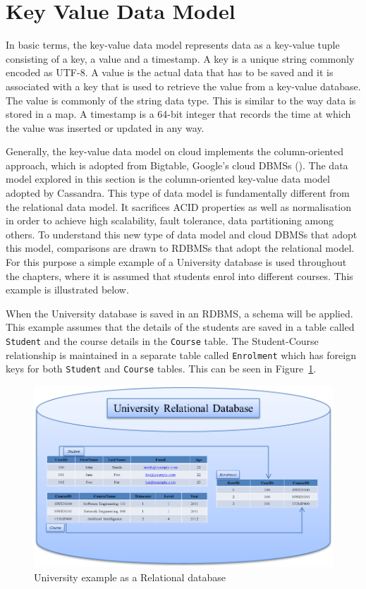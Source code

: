 \section{Key Value Data Model}\label{s:key-value-data-model}
In basic terms,   the key-value data model represents data as a key-value tuple
consisting of a key,   a value and a timestamp.  A key is a unique string
commonly encoded as UTF-8.  A value is the actual data that has to be saved and
it is associated with a key that is used to retrieve the value from a key-value
database.  The value is commonly of the string data type.
This is similar to the way data is stored in a map.  A timestamp is a 64-bit
integer that records the time at which the value was inserted or updated in any
way.

Generally,   the key-value data model on cloud implements the column-oriented
approach,   which is adopted from Bigtable,   Google's cloud \acp{DBMS}
().  The data model explored in this section is the column-oriented
key-value data model adopted by Cassandra.  This type of data model is
fundamentally different from the relational data model.  It sacrifices ACID
properties as well as normalisation in order to achieve high scalability,  
fault tolerance,   data partitioning among others.  To understand this new type
of data model and cloud \acp{DBMS} that adopt this model,   comparisons are
drawn to \acp{RDBMS} that adopt the relational model.  For this purpose a simple
example of a University database is used throughout the chapters,   where it is
assumed that students enrol into different courses.  This example is illustrated
below.

When the University database is saved in an \ac{RDBMS},   a schema will be
applied. This example assumes that the details of the students are saved in a
table called \texttt{Student} and the course details in the \texttt{Course}
table. The Student-Course relationship is maintained in a separate table called
\texttt{Enrolment} which has foreign keys for both \texttt{Student} and
\texttt{Course} tables.  This can be seen in Figure~\ref{f:RDB}. 


\begin{figure}[h]
	\centering
	\includegraphics[width=.8\textwidth]{./figure/Example/Relational-DB.png}
	\caption{University example as a Relational database}\label{f:RDB}
\end{figure}

